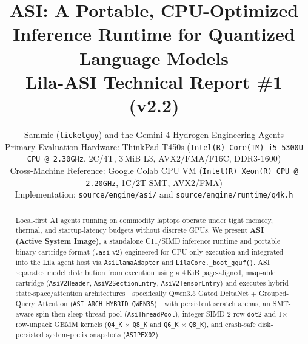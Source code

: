 \documentclass[11pt,a4paper]{article}
\title{\textbf{ASI: A Portable, CPU-Optimized Inference Runtime for Quantized Language Models}\\[0.4em]
\large Lila-ASI Technical Report \#1 (v2.2)}
\author{Sammie (\texttt{ticketguy}) and the Gemini 4 Hydrogen Engineering Agents\\[0.4em]
\small Primary Evaluation Hardware: ThinkPad T450s (\texttt{Intel(R) Core(TM) i5-5300U CPU @ 2.30GHz}, 2C/4T, 3\,MiB L3, AVX2/FMA/F16C, DDR3-1600)\\
\small Cross-Machine Reference: Google Colab CPU VM (\texttt{Intel(R) Xeon(R) CPU @ 2.20GHz}, 1C/2T SMT, AVX2/FMA)\\
\small Implementation: \texttt{source/engine/asi/} and \texttt{source/engine/runtime/q4k.h}}
\date{}
\begin{document}
\maketitle

\begin{abstract}
Local-first AI agents running on commodity laptops operate under tight memory, thermal, and startup-latency budgets without discrete GPUs. We present \textbf{ASI (Active System Image)}, a standalone C11/SIMD inference runtime and portable binary cartridge format (\texttt{.asi} v2) engineered for CPU-only execution and integrated into the Lila agent host via \texttt{AsiLlamaAdapter} and \texttt{LilaCore.\_boot\_gguf()}. ASI separates model distribution from execution using a 4\,KiB page-aligned, \texttt{mmap}-able cartridge (\texttt{AsiV2Header}, \texttt{AsiV2SectionEntry}, \texttt{AsiV2TensorEntry}) and executes hybrid state-space/attention architectures---specifically Qwen3.5 Gated DeltaNet + Grouped-Query Attention (\texttt{ASI\_ARCH\_HYBRID\_QWEN35})---with persistent scratch arenas, an SMT-aware spin-then-sleep thread pool (\texttt{AsiThreadPool}), integer-SIMD 2-row \texttt{dot2} and 1$\times$ row-unpack GEMM kernels (\texttt{Q4\_K} $\times$ \texttt{Q8\_K} and \texttt{Q6\_K} $\times$ \texttt{Q8\_K}), and crash-safe disk-persisted system-prefix snapshots (\texttt{ASIPFX02}).


\end{abstract}
\end{document}
